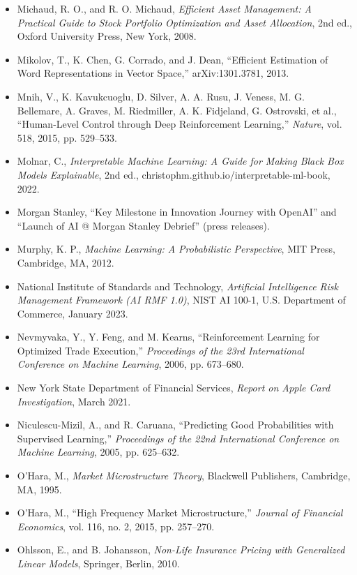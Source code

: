 \documentclass{book}
\begin{document}
\begin{itemize}
    \item Michaud, R. O., and R. O. Michaud, \emph{Efficient Asset Management: A Practical Guide to Stock Portfolio Optimization and Asset Allocation}, 2nd ed., Oxford University Press, New York, 2008.
    \item Mikolov, T., K. Chen, G. Corrado, and J. Dean, ``Efficient Estimation of Word Representations in Vector Space,'' arXiv:1301.3781, 2013.
    \item Mnih, V., K. Kavukcuoglu, D. Silver, A. A. Rusu, J. Veness, M. G. Bellemare, A. Graves, M. Riedmiller, A. K. Fidjeland, G. Ostrovski, et al., ``Human-Level Control through Deep Reinforcement Learning,'' \emph{Nature}, vol. 518, 2015, pp. 529--533.
    \item Molnar, C., \emph{Interpretable Machine Learning: A Guide for Making Black Box Models Explainable}, 2nd ed., christophm.github.io/interpretable-ml-book, 2022.
    \item Morgan Stanley, ``Key Milestone in Innovation Journey with OpenAI'' and ``Launch of AI @ Morgan Stanley Debrief'' (press releases).
    \item Murphy, K. P., \emph{Machine Learning: A Probabilistic Perspective}, MIT Press, Cambridge, MA, 2012.
    \item National Institute of Standards and Technology, \emph{Artificial Intelligence Risk Management Framework (AI RMF 1.0)}, NIST AI 100-1, U.S. Department of Commerce, January 2023.
    \item Nevmyvaka, Y., Y. Feng, and M. Kearns, ``Reinforcement Learning for Optimized Trade Execution,'' \emph{Proceedings of the 23rd International Conference on Machine Learning}, 2006, pp. 673--680.
    \item New York State Department of Financial Services, \emph{Report on Apple Card Investigation}, March 2021.
    \item Niculescu-Mizil, A., and R. Caruana, ``Predicting Good Probabilities with Supervised Learning,'' \emph{Proceedings of the 22nd International Conference on Machine Learning}, 2005, pp. 625--632.
    \item O'Hara, M., \emph{Market Microstructure Theory}, Blackwell Publishers, Cambridge, MA, 1995.
    \item O'Hara, M., ``High Frequency Market Microstructure,'' \emph{Journal of Financial Economics}, vol. 116, no. 2, 2015, pp. 257--270.
    \item Ohlsson, E., and B. Johansson, \emph{Non-Life Insurance Pricing with Generalized Linear Models}, Springer, Berlin, 2010.

\end{itemize}
\end{document}
